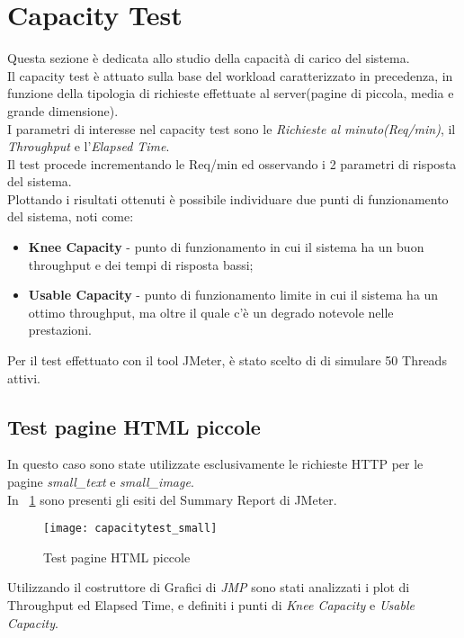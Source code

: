 \section{Capacity Test}
Questa sezione è dedicata allo studio della capacità di carico del sistema.\\
Il capacity test è attuato sulla base del workload caratterizzato in precedenza,
in funzione della tipologia di richieste effettuate al server(pagine di
piccola, media e grande dimensione).\\
I parametri di interesse nel capacity test sono le \textit{Richieste al minuto(Req/min)},
il \textit{Throughput} e l'\textit{Elapsed Time}.\\
Il test procede incrementando le Req/min ed osservando i 2 parametri di risposta
del sistema.\\
Plottando i risultati ottenuti è possibile individuare due punti di funzionamento
del sistema, noti come:
\begin{itemize}
  \item \textbf{Knee Capacity} - punto di funzionamento in cui il sistema ha un
  buon throughput e dei tempi di risposta bassi;
  \item \textbf{Usable Capacity} - punto di funzionamento limite in cui il sistema
  ha un ottimo throughput, ma oltre il quale c'è un degrado notevole nelle prestazioni.
\end{itemize}

Per il test effettuato con il tool JMeter, è stato scelto di di simulare 50 Threads
attivi.\\

\subsection{Test pagine HTML piccole}
In questo caso sono state utilizzate esclusivamente le richieste HTTP per le pagine
\textit{small\_text} e \textit{small\_image}.\\
In \figurename~\ref{small_page_summary_report} sono presenti gli esiti del
Summary Report di JMeter.\\

\begin{figure}[!htbp]
  \centering
  \texttt{[image: capacitytest\_small]}
  \caption{Test pagine HTML piccole}
  \label{small_page_summary_report}
\end{figure}

Utilizzando il costruttore di Grafici di \textit{JMP} sono stati analizzati i plot
di Throughput ed Elapsed Time, e definiti i punti di \textit{Knee Capacity} e
\textit{Usable Capacity}.\\

